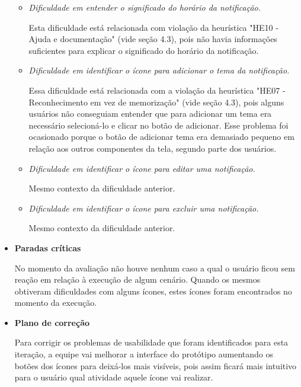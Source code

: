 \begin{itemize}
	  \begin{itemize}
	  
	  \item \emph{Dificuldade em entender o significado do horário da notificação.}
	    
	    \subitem Esta dificuldade está relacionada com violação da heurística "HE10 - Ajuda e documentação" (vide seção 4.3),
	    pois não havia informações suficientes para explicar o significado do horário da notificação.
	  
	  \item \emph{Dificuldade em identificar o ícone para adicionar o tema da notificação.}
	    
	    \subitem Essa dificuldade está relacionada com a violação da heurística "HE07 - Reconhecimento em vez de memorização" (vide seção 4.3),
	    pois alguns usuários não conseguiam entender que para adicionar um tema era necessário selecioná-lo e clicar no botão de
	    adicionar. Esse problema foi ocasionado porque o botão de adicionar tema era demasiado pequeno em relação
	    aos outros componentes da tela, segundo parte dos usuários. 
	  
	  \item \emph{Dificuldade em identificar o ícone para editar uma notificação.}
	    
	    \subitem Mesmo contexto da dificuldade anterior.
	    
	  \item \emph{Dificuldade em identificar o ícone para excluir uma notificação.}
	    
	    \subitem Mesmo contexto da dificuldade anterior.
	  
	  \end{itemize}
       
       \item \textbf{Paradas críticas}
       
	  \subitem No momento da avaliação não houve nenhum caso a qual o usuário ficou sem reação em relação à execução de algum cenário. 
	  Quando os mesmos obtiveram dificuldades com alguns ícones, estes ícones foram encontrados no momento da execução.
       
       \item \textbf{Plano de correção}
       
	  \subitem Para corrigir os problemas de usabilidade que foram identificados para esta iteração, a equipe vai melhorar a
	  interface do protótipo aumentando os botões dos ícones para deixá-los mais visíveis, pois assim ficará mais intuitivo
	  para o usuário qual atividade aquele ícone vai realizar.
       
      \end{itemize}
      
